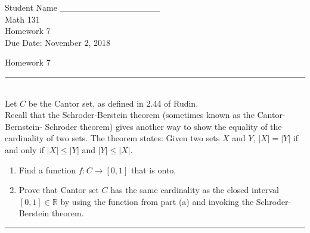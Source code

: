 \documentclass[12pt, fleqn]{article}
\newenvironment{problem}[1]{
\medskip \hrule \medskip
\noindent {\bf Problem #1.}
}{
\medskip \hrule \medskip
}
\begin{document}
\pagestyle{myheadings}

\begin{flushright}
Student Name \_\_\_\_\_\_\_\_\_\_\_\_\_\_\_\_\\
Math 131 \\
Homework 7 \\
Due Date: November 2, 2018 \\
\end{flushright}



\begin{center} {\Large Homework 7}  \end{center}


\begin{problem}{1}
\\
Let $C$ be the Cantor set, as defined in 2.44 of Rudin.
\\
Recall that the Schroder-Berstein theorem (sometimes known as the Cantor-Bernstein- Schroder theorem) gives another way to show the equality of the cardinality of two sets. The theorem states: Given two sets $X$ and $Y$, $|X| = |Y|$ if and only if $|X| \leq |Y|$ and $|Y| \leq |X|$.

\begin{enumerate}

	\item Find a function $f : C \rightarrow [0, 1]$ that is onto. 
	\item Prove that Cantor set $C$ has the same cardinality as the closed interval $[0, 1] \in \mathbb{R}$ by using the function from part (a) and invoking the Schroder-Berstein theorem.

\end{enumerate}

\end{problem}
\end{document}
